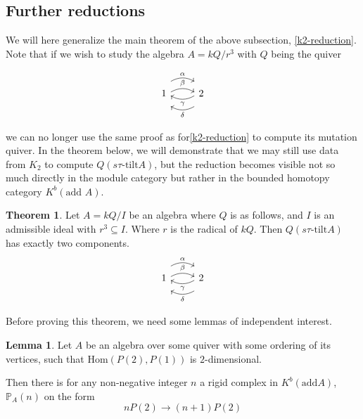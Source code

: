 \documentclass[]{article}
\theoremstyle{definition}
\newtheorem{theorem}{Theorem}[section]
\newtheorem{lemma}{Lemma}[section]
\newcommand{\tu}{\ensuremath{\tau}}
\begin{document}
\subsection{Further reductions}
We will here generalize the main theorem of the above subsection, \cref{k2-reduction}. Note that if we wish to study the algebra $A = kQ/r^3$ with $Q$ being the quiver

\[\begin{tikzcd}
	1 
	\arrow[r,bend left,shift right = 0.5ex, "\beta"]
	\arrow[r,bend left, shift left = 2ex, "\alpha"]
	& 2 \arrow[l,bend left,shift right = 0.5ex,"\gamma"]
	\arrow[l,bend left,shift left = 2ex, "\delta"]  \\
\end{tikzcd}
\]

we can no longer use the same proof as for\cref{k2-reduction} to compute its mutation quiver. In the theorem below, we will demonstrate that we may still use data from $K_2$ to compute $Q(s\tu\text{-tilt} A)$, but the reduction becomes visible not so much directly in the module category but rather in the bounded homotopy category $K^b(\text{add } A)$.

\begin{theorem}
	Let $A = kQ/I$ be an algebra where $Q$ is as follows, and $I$ is an admissible ideal with $r^3 \subseteq I$. Where $r$ is the radical of $kQ$. Then $Q(s\tu\text{-tilt} A)$ has exactly two components.
\[\begin{tikzcd}
	1 
	\arrow[r,bend left,shift right = 0.5ex, "\beta"]
	\arrow[r,bend left, shift left = 2ex, "\alpha"]
	& 2 \arrow[l,bend left,shift right = 0.5ex,"\gamma"]
	\arrow[l,bend left,shift left = 2ex, "\delta"]  \\
\end{tikzcd}
\]
\end{theorem}

Before proving this theorem, we need some lemmas of independent interest.

\begin{lemma}\label{2term-reduction}
	Let $A$ be an algebra over some quiver with some ordering of its vertices, such that $\text{Hom}(P(2),P(1))$ is $2$-dimensional.
	
	Then there is for any non-negative integer $n$ a rigid complex in $K^b(\text{add} A)$, $\mathbb{P}_A(n)$ on the form \[nP(2) \to (n+1)P(2)\]

\end{lemma}
\end{document}
